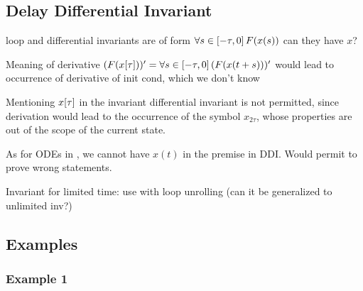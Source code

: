 \documentclass[10pt]{report}
\begin{document}
        \subsection{Delay Differential Invariant}
            \label{sec:delay-differential-invariant}

            loop and differential invariants are of form $\forall s\in[-\tau,0]{\,} F(x(s))$
            can they have $x$?

            Meaning of derivative $(F(x[\tau]))'=\forall s\in[-\tau,0]{\,} (F(x(t+s)))'$ would lead to occurrence of derivative of init cond, which we don't know

            Mentioning $x[\tau]$ in the invariant differential invariant is not permitted, since derivation would lead to the occurrence of the symbol $x_{2\tau}$, whose properties are out of the scope of the current state.

            As for ODEs in \dL, we cannot have $x(t)$ in the premise in DDI. Would permit to prove wrong statements.

            Invariant for limited time: use with loop unrolling (can it be generalized to unlimited inv?)

        \subsection{Examples}
            \label{sec:examples}

            \subsubsection{Example 1}
                \label{sec:ddi-example-1}
\end{document}
